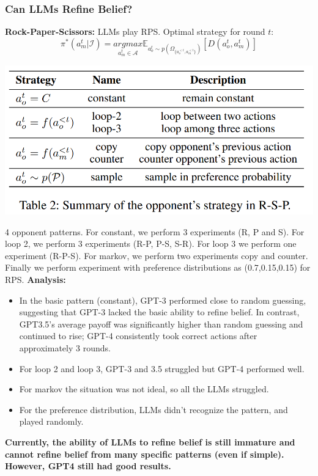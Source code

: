 \documentclass[12pt]{article}
\begin{document}
\subsubsection*{Can LLMs Refine Belief?}
\textbf{Rock-Paper-Scissors:} LLMs play RPS. Optimal strategy for round $t$:
\[\pi^*(a^t_m|\mathcal{I})=\underset{a^t_m\in \mathcal{A}}{argmax}\mathbb{E}_{a^t_o\sim p(\Omega_{\{a^{<t}_o,a^{<t}_m\}})}\left[D(a^t_o,a^t_m)\right]\]
\begin{center}
  \includegraphics*{table2.png}
\end{center}
4 opponent patterns. For constant, we perform 3 experiments (R, P and S). For loop 2, we perform 3 experiments (R-P, P-S, S-R). For loop 3 we perform one experiment (R-P-S). For markov, we perform two experiments copy and counter. Finally we perform experiment with preference distributions as (0.7,0.15,0.15) for RPS.
\textbf{Analysis:}
\begin{itemize}
  \item  In the basic pattern (constant), GPT-3 performed close to random guessing, suggesting that GPT-3 lacked the basic ability to refine belief. In contrast, GPT3.5's average payoff was significantly higher than random guessing and continued to rise; GPT-4 consistently took correct actions after approximately 3 rounds.
  \item For loop 2 and loop 3, GPT-3 and 3.5 struggled but GPT-4 performed well.
  \item For markov the situation was not ideal, so all the LLMs struggled.
  \item For the preference distribution, LLMs didn't recognize the pattern, and played randomly.
\end{itemize}
\textbf{Currently, the ability of LLMs to refine belief is
still immature and cannot refine belief from many specific
patterns (even if simple). However, GPT4 still had good results.}
\end{document}
